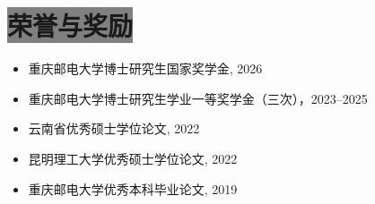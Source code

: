 \documentclass{resume}
\begin{document}
\section{\colorbox{gray}{\color{white}荣誉与奖励}}
\begin{itemize}[itemsep=1.8mm]
  \item 重庆邮电大学博士研究生国家奖学金, 2026
  \item 重庆邮电大学博士研究生学业一等奖学金（三次），2023--2025
  \item 云南省优秀硕士学位论文, 2022
  \item 昆明理工大学优秀硕士学位论文, 2022
  \item 重庆邮电大学优秀本科毕业论文, 2019

\end{itemize}






%
%
\end{document}
